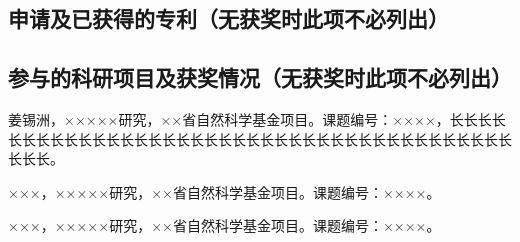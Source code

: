 \begin{resume}
  \subsection{申请及已获得的专利（无获奖时此项不必列出）}

  \begin{bibunit}
    \renewcommand{\bibsection}{}
    \nocite{chenxu2020yejing,jiangxizhou1980}
  \end{bibunit}

  \subsection{参与的科研项目及获奖情况（无获奖时此项不必列出）}
  \begin{achievements}[start=50]
    \item 姜锡洲，×××××研究，××省自然科学基金项目。课题编号：××××，长长长长长长长长长长长长长长长长长长长长长长长长长长长长长长长长长长长长长长长长长长长。
    \item ×××，×××××研究，××省自然科学基金项目。课题编号：××××。
    \item ×××，×××××研究，××省自然科学基金项目。课题编号：××××。
  \end{achievements}

\end{resume}
